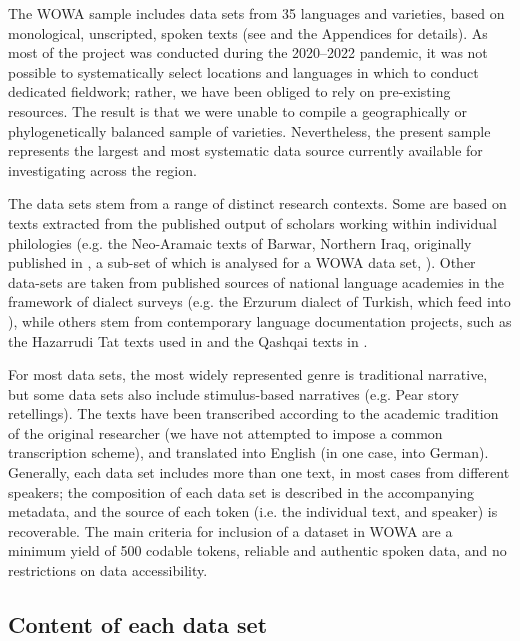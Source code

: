 \documentclass[output=paper,colorlinks,citecolor=brown,collectionchapter]{langscibook}
\begin{document}
The WOWA sample includes data sets from 35 languages and varieties, based on monological, unscripted, spoken texts (see  and the Appendices for details). As most of the project was conducted during the 2020--2022 pandemic, it was not possible to systematically select locations and languages in which to conduct dedicated fieldwork; rather, we have been obliged to rely on pre-existing resources. The result is that we were unable to compile a geographically or phylogenetically balanced sample of varieties. Nevertheless, the present sample represents the largest and most systematic data source currently available for investigating  across the region.

The data sets stem from a range of distinct research contexts. Some are based on texts extracted from the published output of scholars working within individual philologies (e.g. the Neo-Aramaic texts of Barwar, Northern Iraq, originally published in \citealt{Khan2008Barwar}, a sub-set of which is analysed for a WOWA data set, \citealt{stilo_oghuz_2021}). Other data-sets are taken from published sources of national language academies in the framework of dialect surveys (e.g. the Erzurum dialect of Turkish, which feed into \citealt{dogan_oghuz_2021}), while others stem from contemporary language documentation projects, such as the Hazarrudi Tat texts used in \citet{izadifar_tati_2022} and the Qashqai texts in \citet{schreiber_oghuz_2021}.

For most data sets, the most widely represented genre is traditional narrative, but some data sets also include stimulus-based narratives (e.g. Pear story \citep{chafe_pear_1980} retellings). The texts have been transcribed according to the academic tradition of the original researcher (we have not attempted to impose a common transcription scheme), and translated into English (in one case, into German). Generally, each data set includes more than one text, in most cases from different speakers; the composition of each data set is described in the accompanying metadata, and the source of each token (i.e. the individual text, and speaker) is recoverable. The main criteria for inclusion of a dataset in WOWA are a minimum yield of 500 codable tokens, reliable and authentic spoken data, and no restrictions on data accessibility.

\subsection{Content of each data set}\label{Intro:ss:3.1}
\end{document}
